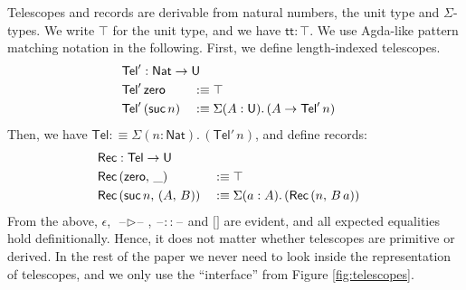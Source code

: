 \documentclass[acmsmall,review,anonymous,prologue,dvipsnames]{acmart}\settopmatter{printfolios=true,printccs=false,printacmref=false}
\renewcommand{\U}{\mathsf{U}}
\newcommand{\blank}{\mathord{\hspace{1pt}\text{--}\hspace{1pt}}}
\renewcommand{\tt}{\mathsf{tt}}
\newcommand{\Nat}{\mathsf{Nat}}
\newcommand{\zero}{\mathsf{zero}}
\newcommand{\suc}{\mathsf{suc}}
\newcommand{\Tel}{\mathsf{Tel}}
\newcommand{\TCons}{\triangleright}
\newcommand{\Rec}{\mathsf{Rec}}
\theoremstyle{remark}
\begin{document}
Telescopes and records are derivable from natural numbers, the unit type and
$\Sigma$-types. We write $\top$ for the unit type, and we have $\tt : \top$. We
use Agda-like pattern matching notation in the following.  First, we define
length-indexed telescopes.
\begin{alignat*}{3}
  & \rlap{$\Tel' : \Nat \to \U$}\\
  & \Tel'\,\zero      && :\equiv \top\\
  & \Tel'\,(\suc\,n)  && :\equiv \Sigma(A : \U).\,(A \to \Tel'\,n)
\end{alignat*}
Then, we have $\Tel :\equiv \Sigma(n : \Nat).\,(\Tel'\,n)$, and define records:
\begin{alignat*}{3}
  & \rlap{$\Rec : \Tel \to \U$}\\
  & \Rec\,(\zero,\,\_)        &&:\equiv \top\\
  & \Rec\,(\suc\,n,\,(A,\,B)) &&:\equiv \Sigma(a : A).\,(\Rec\,(n,\,B\,a))
\end{alignat*}
From the above, $\epsilon$, $\blank\TCons\blank$, $\blank::\blank$ and ${[}{]}$
are evident, and all expected equalities hold definitionally. Hence, it does not
matter whether telescopes are primitive or derived. In the rest of the paper we never
need to look inside the representation of telescopes, and we only use the ``interface''
from Figure \ref{fig:telescopes}.
\end{document}
